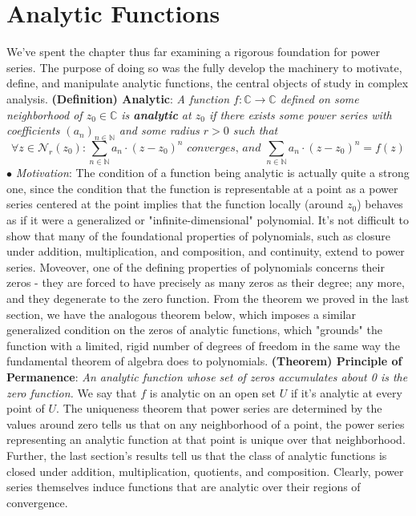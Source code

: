 \documentclass{article}
\newcommand*{\tb}{\textbf}
\newcommand*{\ti}{\textit}
\newcommand*{\nn}{\newline \newline}
\newcommand*{\Mo}{\indent \ensuremath{\bullet} \textit{Motivation}: }
\newcommand*{\N}{\mathbb{N}}
\newcommand*{\C}{\mathbb{C}}
\begin{document}
\section{Analytic Functions}
We've spent the chapter thus far examining a rigorous foundation for power series. The purpose of doing so was the fully develop the machinery to motivate, define, and manipulate analytic functions, the central objects of study in complex analysis.
\nn
\tb{(Definition) Analytic}: \ti{A function $ f: \C \rightarrow \C $ defined on some neighborhood of $ z_0 \in \C $ is \tb{analytic} at $ z_0 $ if there exists some power series with coefficients $ ( a_n )_{n \in \N} $ and some radius $ r > 0 $ such that}
    $$ \forall z \in \mathcal{N}_r(z_0): \sum_{n \in \N} a_n \cdot (z - z_0)^n \ti{ converges, and } \sum_{n \in \N} a_n \cdot (z - z_0)^n = f(z) $$
\Mo The condition of a function being analytic is actually quite a strong one, since the condition that the function is representable at a point as a power series centered at the point implies that the function locally (around $ z_0 $) behaves as if it were a generalized or "infinite-dimensional" polynomial. It's not difficult to show that many of the foundational properties of polynomials, such as closure under addition, multiplication, and composition, and continuity, extend to power series. Moveover, one of the defining properties of polynomials concerns their zeros - they are forced to have precisely as many zeros as their degree; any more, and they degenerate to the zero function. From the theorem we proved in the last section, we have the analogous theorem below, which imposes a similar generalized condition on the zeros of analytic functions, which "grounds" the function with a limited, rigid number of degrees of freedom in the same way the fundamental theorem of algebra does to polynomials.
\nn
\tb{(Theorem) Principle of Permanence}: \ti{An analytic function whose set of zeros accumulates about 0 is the zero function.}
\nn
We say that $ f $ is analytic on an open set $ U $ if it's analytic at every point of $ U $. The uniqueness theorem that power series are determined by the values around zero tells us that on any neighborhood of a point, the power series representing an analytic function at that point is unique over that neighborhood. Further, the last section's results tell us that the class of analytic functions is closed under addition, multiplication, quotients, and composition. Clearly, power series themselves induce functions that are analytic over their regions of convergence.
\end{document}

